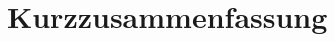 {
\cleardoublepage
\setsinglecolumn
\chapter*{\centering \LARGE Kurzzusammenfassung}
\thispagestyle{empty}
}
